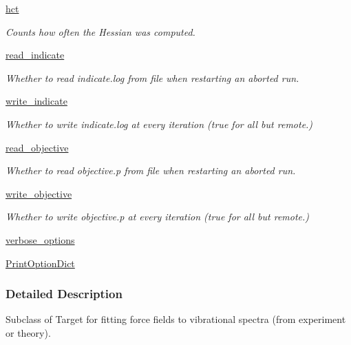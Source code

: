 \begin{DoxyCompactItemize}
\hyperlink{classforcebalance_1_1target_1_1Target_a5b5a42f78052b47f29ed4b940c6111a1}{hct}
\begin{DoxyCompactList}\small\item\em Counts how often the Hessian was computed. \end{DoxyCompactList}\item 
\hyperlink{classforcebalance_1_1target_1_1Target_aa8af57d5be669c4bb1c0cfd4b7a9220e}{read\-\_\-indicate}
\begin{DoxyCompactList}\small\item\em Whether to read indicate.\-log from file when restarting an aborted run. \end{DoxyCompactList}\item 
\hyperlink{classforcebalance_1_1target_1_1Target_a3a2f5d4bbb8d6ecb580eadb261977a57}{write\-\_\-indicate}
\begin{DoxyCompactList}\small\item\em Whether to write indicate.\-log at every iteration (true for all but remote.) \end{DoxyCompactList}\item 
\hyperlink{classforcebalance_1_1target_1_1Target_a22bdc4bbce2020ae44b44ad3e444fda6}{read\-\_\-objective}
\begin{DoxyCompactList}\small\item\em Whether to read objective.\-p from file when restarting an aborted run. \end{DoxyCompactList}\item 
\hyperlink{classforcebalance_1_1target_1_1Target_a7a95624dfe03f0cee0e5f1ae09db306a}{write\-\_\-objective}
\begin{DoxyCompactList}\small\item\em Whether to write objective.\-p at every iteration (true for all but remote.) \end{DoxyCompactList}\item 
\hyperlink{classforcebalance_1_1BaseClass_afd68efa29ccd2f320f4cf82198214aac}{verbose\-\_\-options}
\item 
\hyperlink{classforcebalance_1_1BaseClass_afc6659278497d7245bc492ecf405ccae}{Print\-Option\-Dict}
\end{DoxyCompactItemize}


\subsubsection{Detailed Description}
Subclass of Target for fitting force fields to vibrational spectra (from experiment or theory). 

